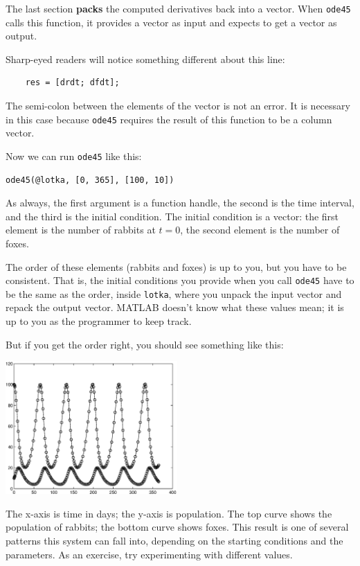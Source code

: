 \documentclass[
]{book}
\begin{document}
The last section {\bf packs} the computed derivatives back into a
vector.  When {\tt ode45} calls this function, it provides a vector
as input and expects to get a vector as output.

Sharp-eyed readers will notice something different about this line:

\begin{verbatim}
    res = [drdt; dfdt];
\end{verbatim}

The semi-colon between the elements of the vector is not an error.  It
is necessary in this case because {\tt ode45} requires the result of
this function to be a column vector.

Now we can run {\tt ode45} like this:

\begin{verbatim}
ode45(@lotka, [0, 365], [100, 10])
\end{verbatim}

As always, the first argument is a function handle, the second is the
time interval, and the third is the initial condition.  The initial
condition is a vector: the first element is the number of rabbits at
$t=0$, the second element is the number of foxes.

The order of these elements (rabbits and foxes) is up to you, but
you have to be consistent.  That is, the initial conditions you
provide when you call {\tt ode45} have to be the same as the order,
inside {\tt lotka}, where you unpack the input vector and repack
the output vector.  MATLAB doesn't know what these values mean;
it is up to you as the programmer to keep track.

But if you get the order right, you should see something like this:

\beforefig \centerline{\includegraphics[height=2in]{figs/lotka.eps}}

The x-axis is time in days; the y-axis is population.  The top
curve shows the population of rabbits; the bottom curve shows
foxes.  This result is one of several patterns
this system can fall into, depending on the starting conditions
and the parameters.  As an exercise, try experimenting with
different values.
\end{document}
